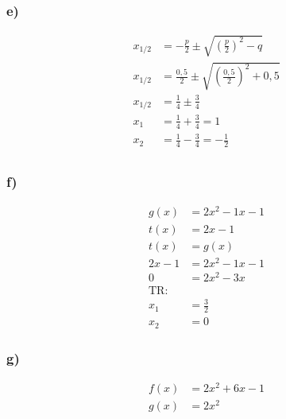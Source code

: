 \documentclass[a4paper]{article}
\begin{document}
	\begin{minipage}{0\textwidth}
		\subsubsection*{e)}
		\begin{align*}
			x_{1/2} &= -\frac{p}{2} \pm\sqrt{(\frac{p}{2})^{2} - q} \\
			x_{1/2} &= \frac{0,5}{2} \pm\sqrt{(\frac{0,5}{2})^{2} + 0,5} \\
			x_{1/2} &= \frac{1}{4} \pm \frac{3}{4} \\
			x_{1} &= \frac{1}{4} + \frac{3}{4} = 1 \\
			x_{2} &= \frac{1}{4} - \frac{3}{4} = -\frac{1}{2} \\
		\end{align*}
		\subsubsection*{f)}
		\begin{align*}
			g(x) &= 2x^{2} - 1x - 1 \\
			t(x) &= 2x - 1 \\
			t(x)&= g(x) \\
			2x - 1&=2x^{2} - 1x - 1 \\
			0 &= 2x^{2} - 3x \\
			\text{TR: } \\
			x_{1} &= \frac{3}{2} \\
			x_{2} &= 0 
		\end{align*}
		\subsubsection*{g)}
		\begin{align*}
			f(x) &= 2x^{2} + 6x - 1 \\
			g(x) &= 2x^{2} \\
		\end{align*}
			 \\
			 \\
	\end{minipage}
\clearpage
\newpage
\end{document}
